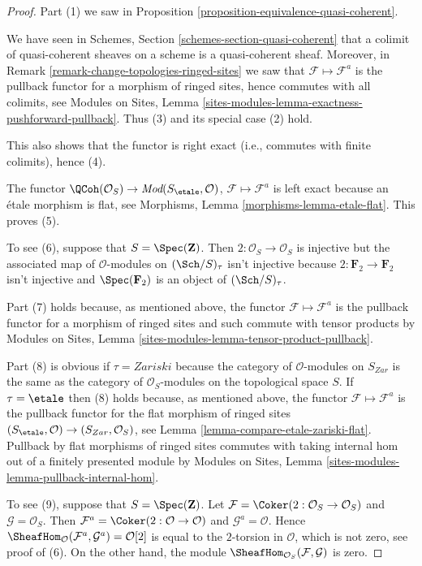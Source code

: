 \begin{proof}
Part (1) we saw in
Proposition \ref{proposition-equivalence-quasi-coherent}.

\medskip\noindent
We have seen in
Schemes, Section \ref{schemes-section-quasi-coherent}
that a colimit of quasi-coherent sheaves on a scheme is a quasi-coherent
sheaf. Moreover, in
Remark \ref{remark-change-topologies-ringed-sites}
we saw that $\mathcal{F} \mapsto \mathcal{F}^a$ is the pullback functor
for a morphism of ringed sites, hence commutes with all colimits, see
Modules on Sites, Lemma
\ref{sites-modules-lemma-exactness-pushforward-pullback}.
Thus (3) and its special case (2) hold.

\medskip\noindent
This also shows that the functor is right exact (i.e., commutes with
finite colimits), hence (4).

\medskip\noindent
The functor $\QCoh(\mathcal{O}_S) \to
\textit{Mod}(S_\etale, \mathcal{O})$,
$\mathcal{F} \mapsto \mathcal{F}^a$
is left exact because an \'etale morphism is flat, see
Morphisms, Lemma \ref{morphisms-lemma-etale-flat}.
This proves (5).

\medskip\noindent
To see (6), suppose that $S = \Spec(\mathbf{Z})$.
Then $2 : \mathcal{O}_S \to \mathcal{O}_S$ is injective but the associated
map of $\mathcal{O}$-modules on $(\Sch/S)_\tau$ isn't
injective because $2 : \mathbf{F}_2 \to \mathbf{F}_2$ isn't injective
and $\Spec(\mathbf{F}_2)$ is an object of $(\Sch/S)_\tau$.

\medskip\noindent
Part (7) holds because, as mentioned above, the functor
$\mathcal{F} \mapsto \mathcal{F}^a$ is the pullback functor
for a morphism of ringed sites and such commute with tensor
products by Modules on Sites, Lemma
\ref{sites-modules-lemma-tensor-product-pullback}.

\medskip\noindent
Part (8) is obvious if $\tau = Zariski$ because the category of
$\mathcal{O}$-modules on $S_{Zar}$ is the same as the category
of $\mathcal{O}_S$-modules on the topological space $S$.
If $\tau = \etale$ then (8) holds because, as mentioned above,
the functor $\mathcal{F} \mapsto \mathcal{F}^a$ is the pullback functor
for the flat morphism of ringed sites
$(S_\etale, \mathcal{O}) \to (S_{Zar}, \mathcal{O}_S)$, see
Lemma \ref{lemma-compare-etale-zariski-flat}.
Pullback by flat morphisms of ringed sites commutes with
taking internal hom out of a finitely presented module by
Modules on Sites, Lemma \ref{sites-modules-lemma-pullback-internal-hom}.

\medskip\noindent
To see (9), suppose that $S = \Spec(\mathbf{Z})$. Let
$\mathcal{F} = \Coker(2 : \mathcal{O}_S \to \mathcal{O}_S)$
and $\mathcal{G} = \mathcal{O}_S$.
Then $\mathcal{F}^a = \Coker(2 : \mathcal{O} \to \mathcal{O})$
and $\mathcal{G}^a = \mathcal{O}$.
Hence
$\SheafHom_\mathcal{O}(\mathcal{F}^a, \mathcal{G}^a) = \mathcal{O}[2]$
is equal to the $2$-torsion in $\mathcal{O}$, which is not zero,
see proof of (6). On the other hand, the module
$\SheafHom_{\mathcal{O}_S}(\mathcal{F}, \mathcal{G})$
is zero.


\end{proof}
